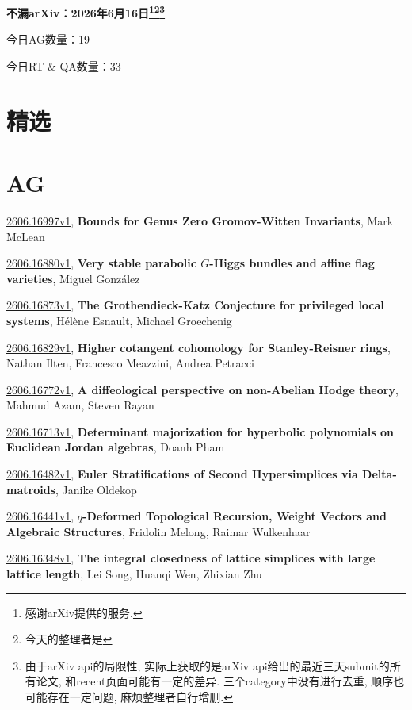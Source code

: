 \documentclass[9pt, a4paper]{article}
\theoremstyle{plain}
\theoremstyle{definition}
\theoremstyle{remark}
\newcommand{\arxiv}[3]{\href{https://arxiv.org/abs/#1}{#1}, \textbf{\textcolor{arxivblue}{#2}}, #3}
\newcommand{\AGnumber}{19}
\newcommand{\RTQAnumber}{33}
\newcommand{\NewestDate}{2026年6月16日}
\newcommand{\todayarXiver}{} %
\begin{document}
\begin{center}
    \Huge\textbf{不漏arXiv：\NewestDate\footnote{感谢arXiv提供的服务.}\footnote{今天的整理者是\todayarXiver}\footnote{由于arXiv api的局限性, 实际上获取的是arXiv api给出的最近三天submit的所有论文, 和recent页面可能有一定的差异. 三个category中没有进行去重, 顺序也可能存在一定问题, 麻烦整理者自行增删.}} \\
\end{center}

\setcounter{section}{-1}

\begin{center}
    今日AG数量：\AGnumber
    
    今日RT \& QA数量：\RTQAnumber
    
\end{center}


\section{精选}


\section{AG}
\arxiv{2606.16997v1}{Bounds for Genus Zero Gromov-Witten Invariants}{Mark McLean}

\arxiv{2606.16880v1}{Very stable parabolic $G$-Higgs bundles and affine flag varieties}{Miguel González}

\arxiv{2606.16873v1}{The Grothendieck-Katz Conjecture for privileged local systems}{Hélène Esnault, Michael Groechenig}

\arxiv{2606.16829v1}{Higher cotangent cohomology for Stanley-Reisner rings}{Nathan Ilten, Francesco Meazzini, Andrea Petracci}

\arxiv{2606.16772v1}{A diffeological perspective on non-Abelian Hodge theory}{Mahmud Azam, Steven Rayan}

\arxiv{2606.16713v1}{Determinant majorization for hyperbolic polynomials on Euclidean Jordan algebras}{Doanh Pham}

\arxiv{2606.16482v1}{Euler Stratifications of Second Hypersimplices via Delta-matroids}{Janike Oldekop}

\arxiv{2606.16441v1}{$q$-Deformed Topological Recursion, Weight Vectors and Algebraic Structures}{Fridolin Melong, Raimar Wulkenhaar}

\arxiv{2606.16348v1}{The integral closedness of lattice simplices with large lattice length}{Lei Song, Huanqi Wen, Zhixian Zhu}
\end{document}
